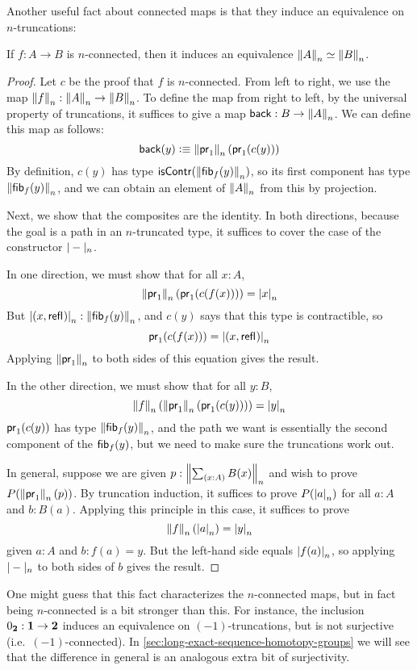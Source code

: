 Another useful fact about connected maps is that they induce an
equivalence on $n$-truncations:

\begin{lem} \label{lem:connected-map-equiv-truncation}
If $f : A \to B$ is $n$-connected, then it induces an equivalence
$\eqv{\trunc{n}{A}}{\trunc{n}{B}}$.
\end{lem}
\begin{proof}
Let $c$ be the proof that $f$ is $n$-connected.  From left to right, we
use the map $\trunc{n}{f} : \trunc{n}{A} \to \trunc{n}{B}$.
To define the map from right to left, by the universal property of
truncations, it suffices to give a map $\mathsf{back} : B \to {\trunc{n}{A}}$.  We can
define this map as follows:
\[
\mathsf{back}(y) \defeq \trunc{n}{\proj{1}}{(\proj{1}{(c(y))})}
\]
By definition, $c(y)$ has type $\iscontr(\trunc n {\hfiber{f}y})$, so its
first component has type $\trunc n{\hfiber{f}y}$, and we can obtain an
element of $\trunc n A$ from this by projection.

Next, we show that the composites are the identity.  In both directions,
because the goal is a path in an $n$-truncated type, it suffices to
cover the case of the constructor $\tprojf{n}$.

In one direction, we must show that for all $x:A$, 
\[
\trunc{n}{\proj{1}}{(\proj{1}{(c(f(x)))})} = \tproj{n}{x}
\]
But $\tproj{n}{(x , \refl{})} : \trunc n{\hfiber{f}y}$, and
$c(y)$ says that this type is contractible, so 
\[
\proj{1}{(c(f(x)))} = \tproj{n}{(x , \refl{})}
\]
Applying $\trunc{n}{\proj{1}}$ to both sides of this equation gives the
result.  

In the other direction, we must show that for all $y:B$, 
\[
\trunc{n}{f}(\trunc{n}{\proj{1}} (\proj{1}{(c(y))})) = \tproj{n}{y}
\]
$\proj{1}{(c(y))}$ has type $\trunc n {\hfiber{f}y}$, and the path we
want is essentially the second component of the $\hfiber{f}y$, but we
need to make sure the truncations work out.  

In general, suppose we are given $p:\trunc{n}{\sm{x:A} B(x)}$ and wish to prove
$P(\trunc{n}{\proj{1}{}}(p))$. By truncation induction, it suffices to
prove $P(\tproj{n}{a})$ for all $a:A$ and $b:B(a)$.  Applying this
principle in this case, it suffices to prove
\[
\trunc{n}{f}(\tproj{n}{a}) = \tproj{n}{y}
\]
given $a:A$ and $b:f (a) = y$.  But the left-hand side equals $\tproj{n}{f (a)}$,
so applying $\tprojf{n}$ to both sides of $b$ gives the result.
\end{proof}

One might guess that this fact characterizes the $n$-connected maps, but in fact being $n$-connected is a bit stronger than this.
For instance, the inclusion $\bfalse:\unit \to\bool$ induces an equivalence on $(-1)$-truncations, but is not surjective (i.e.\ $(-1)$-connected).
In \autoref{sec:long-exact-sequence-homotopy-groups} we will see that the difference in general is an analogous extra bit of surjectivity.


